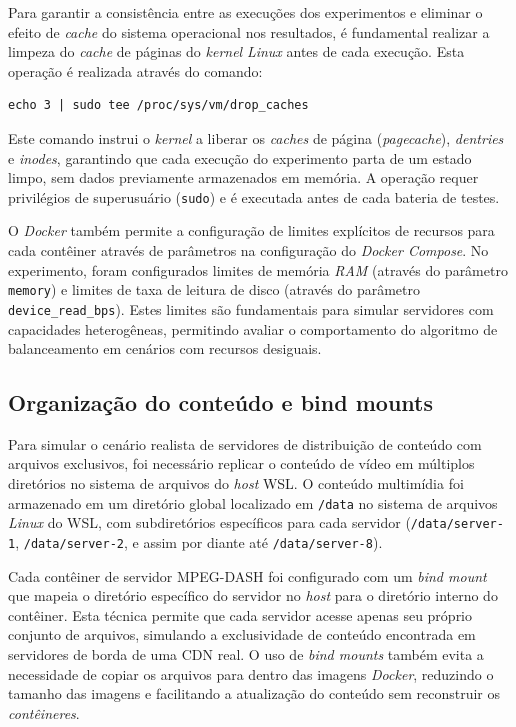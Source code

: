 Para garantir a consistência entre as execuções dos experimentos e eliminar o efeito de \textit{cache} do sistema operacional nos resultados, é fundamental realizar a limpeza do \textit{cache} de páginas do \textit{kernel} \textit{Linux} antes de cada execução. Esta operação é realizada através do comando:

\begin{verbatim}
echo 3 | sudo tee /proc/sys/vm/drop_caches
\end{verbatim}

Este comando instrui o \textit{kernel} a liberar os \textit{caches} de página (\textit{pagecache}), \textit{dentries} e \textit{inodes}, garantindo que cada execução do experimento parta de um estado limpo, sem dados previamente armazenados em memória. A operação requer privilégios de superusuário (\texttt{sudo}) e é executada antes de cada bateria de testes.

O \textit{Docker} também permite a configuração de limites explícitos de recursos para cada contêiner através de parâmetros na configuração do \textit{Docker Compose}. No experimento, foram configurados limites de memória \textit{RAM} (através do parâmetro \texttt{memory}) e limites de taxa de leitura de disco (através do parâmetro \texttt{device\_read\_bps}). Estes limites são fundamentais para simular servidores com capacidades heterogêneas, permitindo avaliar o comportamento do algoritmo de balanceamento em cenários com recursos desiguais.

\subsection{Organização do conteúdo e bind mounts}

Para simular o cenário realista de servidores de distribuição de conteúdo com arquivos exclusivos, foi necessário replicar o conteúdo de vídeo em múltiplos diretórios no sistema de arquivos do \textit{host} WSL. O conteúdo multimídia foi armazenado em um diretório global localizado em \texttt{/data} no sistema de arquivos \textit{Linux} do WSL, com subdiretórios específicos para cada servidor (\texttt{/data/server-1}, \texttt{/data/server-2}, e assim por diante até \texttt{/data/server-8}).

Cada contêiner de servidor MPEG-DASH foi configurado com um \textit{bind mount} que mapeia o diretório específico do servidor no \textit{host} para o diretório interno do contêiner. Esta técnica permite que cada servidor acesse apenas seu próprio conjunto de arquivos, simulando a exclusividade de conteúdo encontrada em servidores de borda de uma CDN real. O uso de \textit{bind mounts} também evita a necessidade de copiar os arquivos para dentro das imagens \textit{Docker}, reduzindo o tamanho das imagens e facilitando a atualização do conteúdo sem reconstruir os \textit{contêineres}.


